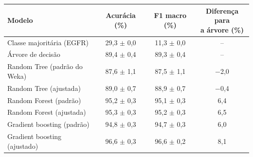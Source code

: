 \begin{tabular}{lccc}
\toprule
Modelo & Acurácia (\%) & F1 macro (\%) & \shortstack{Diferença para\\a árvore (\%)} \\
\midrule
Classe majoritária (EGFR) & 29,3 $\pm$ 0,0 & 11,3 $\pm$ 0,0 & -- \\
Árvore de decisão & 89,4 $\pm$ 0,4 & 89,3 $\pm$ 0,4 & -- \\
Random Tree (padrão do Weka) & 87,6 $\pm$ 1,1 & 87,5 $\pm$ 1,1 & $-$2,0 \\
Random Tree (ajustada) & 89,0 $\pm$ 0,7 & 88,9 $\pm$ 0,7 & $-$0,4 \\
Random Forest (padrão) & 95,2 $\pm$ 0,3 & 95,1 $\pm$ 0,3 & 6,4 \\
Random Forest (ajustada) & 95,3 $\pm$ 0,3 & 95,2 $\pm$ 0,3 & 6,5 \\
Gradient boosting (padrão) & 94,8 $\pm$ 0,3 & 94,7 $\pm$ 0,3 & 6,0 \\
Gradient boosting (ajustado) & 96,6 $\pm$ 0,3 & 96,6 $\pm$ 0,2 & 8,1 \\
\bottomrule
\end{tabular}
